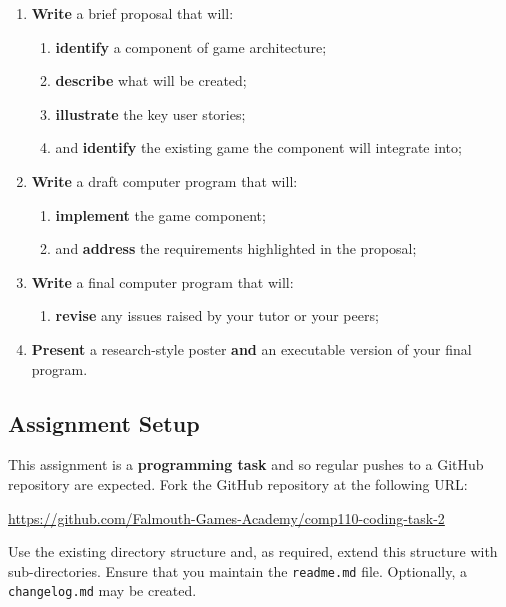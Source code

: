 \documentclass{../fal_assignment}
\begin{document}
\begin{enumerate}[label=(\alph*)]
    \item \textbf{Write} a brief proposal that will:
    	\begin{enumerate}[label=\roman*.]
    		\item \textbf{identify} a component of game architecture;
    		\item \textbf{describe} what will be created;
    		\item \textbf{illustrate} the key user stories;
    		\item and \textbf{identify} the existing game the component will integrate into;
	\end{enumerate}
    \item \textbf{Write} a draft computer program that will:
        	\begin{enumerate}[label=\roman*.]
    		\item \textbf{implement} the game component;
    		\item and \textbf{address} the requirements highlighted in the proposal;
	\end{enumerate}
    \item \textbf{Write} a final computer program that will:
    	\begin{enumerate}[label=\roman*.]
    		\item \textbf{revise} any issues raised by your tutor or your peers;
	\end{enumerate}
    \item \textbf{Present} a research-style poster \textbf{and} an executable version of your final program.
\end{enumerate}


\subsection*{Assignment Setup}

This assignment is a \textbf{programming task} and so regular pushes to a GitHub repository are expected. Fork the GitHub repository at the following URL:

\indent \url{https://github.com/Falmouth-Games-Academy/comp110-coding-task-2}

Use the existing directory structure and, as required, extend this structure with sub-directories. Ensure that you maintain the \texttt{readme.md} file. Optionally, a \texttt{changelog.md} may be created.
\end{document}

